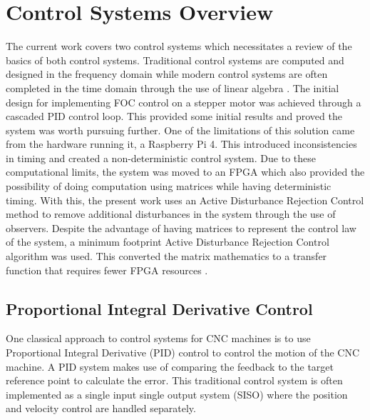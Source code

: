\section{Control Systems Overview}\label{controlSystemOverview}


The current work covers two control systems which necessitates a review of the basics of both control systems. Traditional control systems are computed and designed in the frequency domain while modern control systems are often completed in the time domain through the use of linear algebra \cite{astrom_feedback_2021,binfet_implementation_2026}. The initial design for implementing FOC control on a stepper motor was achieved through a cascaded PID control loop. This provided some initial results and proved the system was worth pursuing further. One of the limitations of this solution came from the hardware running it, a Raspberry Pi 4. This introduced inconsistencies in timing and created a non-deterministic control system. Due to these computational limits, the system was moved to an FPGA which also provided the possibility of doing computation using matrices while having deterministic timing. With this, the present work uses an Active Disturbance Rejection Control method to remove additional disturbances in the system through the use of observers. Despite the advantage of having matrices to represent the control law of the system, a minimum footprint Active Disturbance Rejection Control algorithm was used. This converted the matrix mathematics to a transfer function that requires fewer FPGA resources \cite{binfet_implementation_2026,herbst_minimum_2021}. 

\subsection{Proportional Integral Derivative Control}\label{pidOverview}
One classical approach to control systems for CNC machines is to use Proportional Integral Derivative (PID) control to control the motion of the CNC machine. A PID system makes use of comparing the feedback to the target reference point to calculate the error. This traditional control system is often implemented as a single input single output system (SISO) where the position and velocity control are handled separately\cite{altintas_manufacturing_2012,binfet_implementation_2026}.



